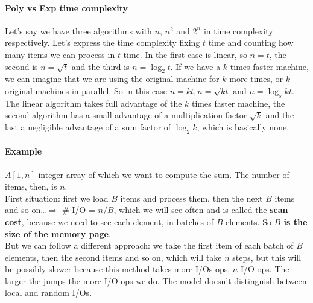 \documentclass[10pt]{report}
\begin{document}
\paragraph{Poly vs Exp time complexity} Let's say we have three algorithms with $n$, $n^2$ and $2^n$ in time complexity respectively. Let's express the time complexity fixing $t$ time and counting how many items we can process in $t$ time. In the first case is linear, so $n = t$, the second is $n = \sqrt{t}$ and the third is $n = \log_2 t$. If we have a $k$ times faster machine, we can imagine that we are using the original machine for $k$ more times, or $k$ original machines in parallel. So in this case $n = kt, n = \sqrt{kt}$ and $n = \log_s kt$. The linear algorithm takes full advantage of the $k$ times faster machine, the second algorithm has a small advantage of a multiplication factor $\sqrt{k}$ and the last a negligible advantage of a sum factor of $\log_2 k$, which is basically none.
\paragraph{Example} $A[1, n]$ integer array of which we want to compute the sum. The number of items, then, is $n$.\\
First situation: first we load $B$ items and process them, then the next $B$ items and so on\ldots $\Rightarrow$ \# I/O = $n/B$, which we will see often and is called the \textbf{scan cost}, because we need to see each element, in batches of $B$ elements. So \textbf{$B$ is the size of the memory page}.\\
But we can follow a different approach: we take the first item of each batch of $B$ elements, then the second items and so on, which will take $n$ steps, but this will be possibly slower because this method takes more I/Os ops, $n$ I/O ops. The larger the jumps the more I/O ops we do. The model doesn't distinguish between local and random I/Os.
\end{document}
